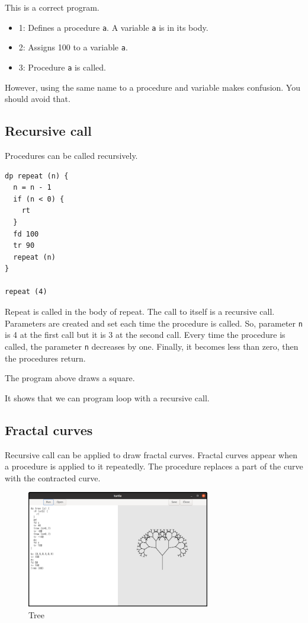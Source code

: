 This is a correct program.

\begin{itemize}
\tightlist
\item
  1: Defines a procedure \passthrough{\lstinline!a!}. A variable
  \passthrough{\lstinline!a!} is in its body.
\item
  2: Assigns 100 to a variable \passthrough{\lstinline!a!}.
\item
  3: Procedure \passthrough{\lstinline!a!} is called.
\end{itemize}

However, using the same name to a procedure and variable makes
confusion. You should avoid that.

\subsection{Recursive call}\label{recursive-call}

Procedures can be called recursively.

\begin{lstlisting}
dp repeat (n) {
  n = n - 1
  if (n < 0) {
    rt
  }
  fd 100
  tr 90
  repeat (n)
}

repeat (4)
\end{lstlisting}

Repeat is called in the body of repeat. The call to itself is a
recursive call. Parameters are created and set each time the procedure
is called. So, parameter \passthrough{\lstinline!n!} is 4 at the first
call but it is 3 at the second call. Every time the procedure is called,
the parameter \passthrough{\lstinline!n!} decreases by one. Finally, it
becomes less than zero, then the procedures return.

The program above draws a square.

It shows that we can program loop with a recursive call.

\subsection{Fractal curves}\label{fractal-curves}

Recursive call can be applied to draw fractal curves. Fractal curves
appear when a procedure is applied to it repeatedly. The procedure
replaces a part of the curve with the contracted curve.

\begin{figure}
\centering
\includegraphics[width=8cm,height=5.11cm]{../src/turtle/image/turtle_tree.png}
\caption{Tree}
\end{figure}

